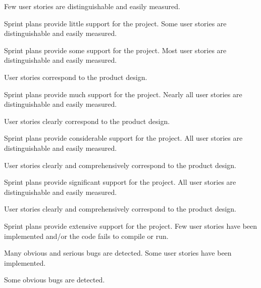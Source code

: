 \documentclass{../fal_assignment}
\begin{document}
\begin{markingrubric}
%
        \grade \fail Few user stories are distinguishable and easily measured.
            \par Sprint plans provide little support for the project.
        \grade Some user stories are distinguishable and easily measured.
            \par Sprint plans provide some support for the project.
        \grade Most user stories are distinguishable and easily measured.
            \par User stories correspond to the product design.
            \par Sprint plans provide much support for the project.
        \grade Nearly all user stories are distinguishable and easily measured.
            \par User stories clearly correspond to the product design.
            \par Sprint plans provide considerable support for the project.
        \grade All user stories are distinguishable and easily measured.
            \par User stories clearly and comprehensively correspond to the product design.
            \par Sprint plans provide significant support for the project.
        \grade All user stories are distinguishable and easily measured.
            \par User stories clearly and comprehensively correspond to the product design.
            \par Sprint plans provide extensive support for the project.
%
        \grade \fail Few user stories have been implemented  and/or the code fails to compile or run.
            \par Many obvious and serious bugs are detected.
        \grade Some user stories have been implemented.
            \par Some obvious bugs are detected.

\end{markingrubric}
\end{document}

